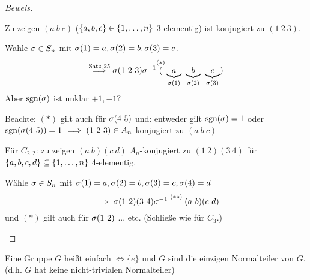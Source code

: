 \documentclass[a4paper]{report}
\begin{document}
\begin{proof}[Beweis]
\begin{enumerate}[(a)]
        Zu zeigen $(a\ b\ c)$ ($\{a, b, c\} \in \{1, \ldots, n\}$ 3 elementig) ist konjugiert zu  $(1\ 2\ 3)$.

        Wahle $\sigma \in S_n$ mit $\sigma(1)=a, \sigma(2)=b, \sigma(3)=c$.
        \[\overset{\text{Satz 25}}\imp \s(1\ 2\ 3)\s^{-1} \overset{(*)} (\underbrace a_{{\s(1)}}\ \underbrace b_{{\s(2)}}\ \underbrace c_{{\s(3)}})\]
        Aber $\operatorname{sgn}(\sigma)$ ist unklar $+1, -1?$

        Beachte: $(*)$ gilt auch für $\sigma(4\ 5)$ und: entweder gilt $\operatorname{sgn}(\sigma) = 1$ oder $\operatorname{sgn}(\sigma(4\ 5)) = 1$
        \(\implies (1\ 2\ 3) \in A_{n}\) konjugiert zu $(a\ b\ c)$

        Für $C_{2, 2}$: zu zeigen $(a\ b)(c\ d)$ $A_{n}$-konjugiert zu $(1\ 2)(3\ 4)$ für $\{a, b, c, d\} \subseteq \{1, \ldots, n\}$ 4-elementig.

        Wähle $\sigma \in S_n$ mit $\sigma(1)=a, \sigma(2)=b, \sigma(3)=c, \sigma(4)=d$
        \[\imp \s (1\ 2)(3\ 4)\s^{-1} \overset{(**)}= (a\ b)(c\ d)\]
        und $(*)$ gilt auch für $\sigma(1\ 2)$ ... etc. (Schließe wie für $C_{3}$.)
\end{enumerate}
\end{proof}

\begin{defi}
  Eine Gruppe $G$ heißt einfach $\iff \{e\}$ und $G$ sind die einzigen Normalteiler von $G$. (d.h. $G$ hat keine nicht-trivialen Normalteiler)
\end{defi}
\end{document}
